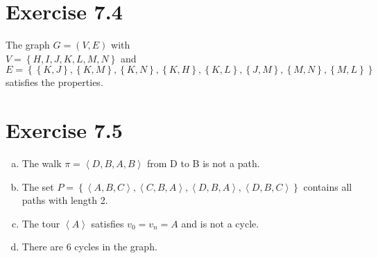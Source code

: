 \documentclass{article} %
\newcommand{\homeworkNumber}{7}
\begin{document}
\section*{Exercise \homeworkNumber.4}
The graph \( G = (V,E) \) with \\
\( V = \left\{ H, I, J, K, L, M, N  \right\}  \) and \\
\( E = \left\{ \left\{ K, J \right\}, \left\{ K,M \right\}, \left\{ K,N \right\}, \left\{ K,H \right\}, \left\{ K,L \right\}, \left\{ J,M \right\}, \left\{ M,N \right\}, \left\{ M,L \right\}   \right\} \) \\
satisfies the properties.



\section*{Exercise \homeworkNumber.5}

\begin{enumerate}[(a)]
	\item The walk \( \pi =  \left< D,B,A,B \right> \) from D to B is not a path.
	\item The set \( P = \left\{ \left< A, B, C \right>, \left< C, B, A \right>, \left< D,B,A \right>, \left< D,B,C \right> \right\}   \) contains all paths with length 2.
	\item The tour \( \left< A \right> \) satisfies \( v_{0} = v_{n} = A \) and is not a cycle.
	\item There are 6 cycles in the graph.
\end{enumerate}
\end{document}
